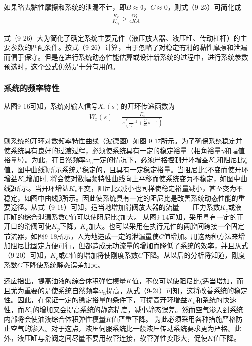 如果略去黏性摩擦和系统的泄漏不计，即$B\approx 0$，$C\approx 0$，则式（9-25）可简化成
\begin{align}
    \frac{K_{c}}{K_{Q}}>\frac{iV_{\text{t}}}{4KA}
\end{align}

式（9-26）大为简化了确定系统主要元件（液压放大器、液压缸、传动杠杆）的主要参数的匹配条件。按式（9-26）计算，由于忽略了对稳定有利的黏性摩擦和泄漏而偏于保守。但是在进行系统动态性能估算或设计新系统的过程中，进行系统参数预选时，这个公式仍然是十分有用的。

\subsubsection{系统的频率特性}

从图9-16可知，系统对输人信号$X_{\text{r}}(s)$的开环传递函数为
\begin{align}
    W_{\text{r}}(s)=\frac{K_{v}}{s(\frac{1}{\omega_{\text{n}}^2}s^2+\frac{2\zeta }{\omega_{\text{n}}}s+1)}
\end{align}

\noindent 则系统的开环对数频率特性曲线（波德图）如图
9-17所示。为了确保系统稳定并使系统具有良好的过渡过程，必须使系统具有一定的稳定裕量（相角裕量$\gamma $和幅值裕量$h$）。为此，在自然频率$\omega_{\text{n}}$一定的情况下，必须严格控制开环增益$K_{v}$和阻尼比$\zeta $值，图中曲线\textcircled{1}所示系统是稳定的，且具有一定稳定裕量。当阻尼比$\zeta $不变而使开环增益$K_{v}$增加时,
将会使对数幅频特性曲线向上平移而使系统变为不稳定，如图中曲线\textcircled{2}所示。当开环增益$K_{v}$不变，阻尼比$\zeta $减小也同样使稳定裕量减小，甚至变为不稳定，如图中曲线\textcircled{3}所示。因此使系统具有一定的阻尼比是改善系统动态性能的重要途径。从式（9-19）可知，适当地增加滑阀放大器的流量——压力系数$K_{c}$或液压缸的综合泄漏系数$C$值可以使阻尼比$\zeta $加大。
从图9-14可知，采用具有一定的正开口的滑阀可使$K_{p}$下降，$K_{c}$加大。也可以采用在执行元件的两腔间跨接一个固定节流器，如图9-18所示，人为地造成一定的泄漏量使$C$值增加。用这两种方法来增加阻尼比固定方便可行，但都造成无功流量的增加而降低了系统的效率，并且从式（9-20）可知，$K_{c}$或$C$值的增加将使刚度系数$G$下降。从以后的分析将知道，刚度系数$G$下降使系统静态误差加大。

还应指出，提高油液的综合体积弹性模量$K$值，不仅可以使阻尼比$\zeta $适当增加，而且尤为重要的是使系统自然频率$\omega_{\text{n}}$提高，从式（9-24）可知，这将改善系统的稳定性。因此，在保证一定的稳定裕量的条件下，可提高开环增益$K_{v}$和系统的快速性，而$K_{v}$的增加又会提高系统的静态精度，减小静态误差。然而空气渗入到系统内部将会使油液综合体积弹性模量$K$值严重下降。
为此必须采用各种措施严格防止空气的渗入。对于这点，液压伺服系统比一般液压传动系统要求更为严格。此外，液压缸与滑阀之间尽量不要用软管连接，软管弹性变形大，促使$K$值下降。

